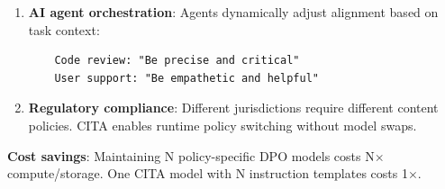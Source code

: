 \begin{enumerate}[label=\textbf{Q\arabic*.}, leftmargin=*, itemsep=8pt]
\begin{enumerate}[leftmargin=*,itemsep=2pt]
    \item \textbf{AI agent orchestration}: Agents dynamically adjust alignment based on task context:
    \begin{verbatim}
    Code review: "Be precise and critical"
    User support: "Be empathetic and helpful"
    \end{verbatim}

    \item \textbf{Regulatory compliance}: Different jurisdictions require different content policies. CITA enables runtime policy switching without model swaps.
\end{enumerate}

\textbf{Cost savings}: Maintaining N policy-specific DPO models costs N$\times$ compute/storage. One CITA model with N instruction templates costs 1$\times$.

\end{enumerate}

\twocolumn
